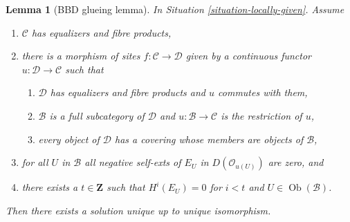 \documentclass{stacks-project}
\theoremstyle{plain}
\newtheorem{lemma}[subsection]{Lemma}
\theoremstyle{definition}
\theoremstyle{remark}
\numberwithin{equation}{subsection}
\def\Ob{\mathop{\mathrm{Ob}}\nolimits}
\begin{document}
\begin{lemma}[BBD glueing lemma]
\label{lemma-bbd-glueing}
In Situation \ref{situation-locally-given}. Assume
\begin{enumerate}
\item $\mathcal{C}$ has equalizers and fibre products,
\item there is a morphism of sites $f : \mathcal{C} \to \mathcal{D}$
given by a continuous functor $u : \mathcal{D} \to \mathcal{C}$
such that
\begin{enumerate}
\item $\mathcal{D}$ has equalizers and fibre products and $u$
commutes with them,
\item $\mathcal{B}$ is a full subcategory of $\mathcal{D}$
and $u : \mathcal{B} \to \mathcal{C}$ is the restriction of $u$,
\item every object of $\mathcal{D}$ has a covering whose members
are objects of $\mathcal{B}$,
\end{enumerate}
\item for all $U$ in $\mathcal{B}$ all negative self-exts of $E_U$
in $D(\mathcal{O}_{u(U)})$ are zero, and
\item there exists a $t \in \mathbf{Z}$ such that $H^i(E_U) = 0$ for $i < t$
and $U \in \Ob(\mathcal{B})$.
\end{enumerate}
Then there exists a solution unique up to unique isomorphism.
\end{lemma}
\end{document}
